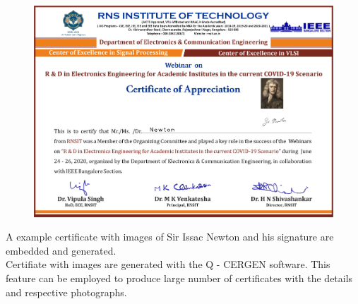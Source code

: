 \begin{figure}[H]
	\centering
	\includegraphics[width=0.95\linewidth]{images/image_on_cert/Newton_0}
	\label{fig:newton0}
\end{figure}

A example certificate with images of Sir Issac Newton and his signature are embedded and generated.\\

Certifiate with images are generated with the Q - CERGEN software. This feature can be employed to produce large number of certificates with the details and respective photographs.